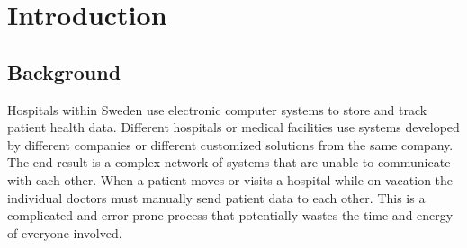 \documentclass[14pt]{article}
\begin{document}
\begin{abstract}


\glspl{EHR} are rapidly expanding in their use and their benefits are well known. Significant reduction in the cost of care, improved quality of care, and improved record keeping are just a few of the benefits of using an \gls{EHR}. It is for these reasons that many medical institutions are rapidly adopting \glspl{EHR}. 

An explosion of innovation has stemmed from this rapid adoption and has produced many different solutions from many different providers. Unfortunately, these solutions tend to store and transmit the information that they collect in formats that are not compatible with each other. In order to maximize the benefit received from these \glspl{EHR} they must be able to share information between different systems and locations.

This paper reports on the various aspects of achieving \gls{EHR} \gls{interoperability}.
\end{abstract}

\newpage

\tableofcontents

\newpage

%
%
%

\section{Introduction}
\label{sec:Introduction}

\subsection{Background}
Hospitals within Sweden use electronic computer systems to store and track patient health data. Different hospitals or medical facilities use systems developed by different companies or different customized solutions from the same company. The end result is a complex network of systems that are unable to communicate with each other. When a patient moves or visits a hospital while on vacation the individual doctors must manually send patient data to each other. This is a complicated and error-prone process that potentially wastes the time and energy of everyone involved.
\end{document}
